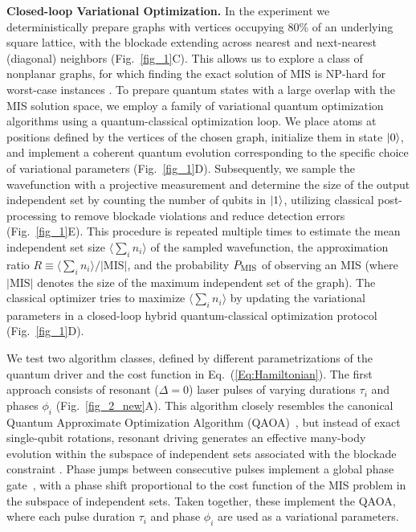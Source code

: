 \documentclass[twocolumn,amssymb,secnumarabic, prl, aps, nofootinbib]{revtex4-1}
\newcommand{\PMIS}{P_\textnormal{MIS}}
\begin{document}
\noindent \textbf
{Closed-loop Variational Optimization.}
In the experiment we deterministically prepare graphs with vertices occupying $80$\% of an underlying square lattice, with the blockade extending across nearest and next-nearest (diagonal) neighbors (Fig.~\ref{fig_1}C). This allows us to explore a class of nonplanar graphs, for which finding the exact solution of MIS is NP-hard for worst-case instances \cite{SI}. To prepare quantum states with a large overlap with the MIS solution space, we employ a family of variational quantum optimization algorithms using a quantum-classical optimization loop. We place atoms at positions defined by the vertices of the chosen graph, initialize them in state $\ket{0}$, and implement a coherent quantum evolution corresponding to the specific choice of variational parameters (Fig.~\ref{fig_1}D). Subsequently, we sample the wavefunction with a projective measurement and determine the size of the output independent set by counting the number of qubits in $\ket{1}$, utilizing classical post-processing to remove blockade violations and reduce detection errors \cite{SI} (Fig.~\ref{fig_1}E). This procedure is repeated multiple times to estimate the mean independent set size $\langle \sum_i n_i \rangle$ of the sampled wavefunction, the approximation ratio $R \equiv \langle \sum_i n_i \rangle/|\text{MIS}|$, and the probability $\PMIS$ of observing an MIS (where $|\text{MIS}|$ denotes the size of the maximum independent set of the graph). The classical optimizer tries to maximize $\langle \sum_i n_i \rangle$ by updating the variational parameters in a closed-loop hybrid quantum-classical optimization protocol \cite{SI} (Fig.~\ref{fig_1}D).


We test two algorithm classes, defined by different parametrizations of the quantum driver and the cost function in Eq.~(\ref{Eq:Hamiltonian}). The first approach consists of resonant ($\Delta = 0$) laser pulses of varying durations $\tau_i$ and phases $\phi_i$ (Fig.~\ref{fig_2_new}A). This algorithm closely resembles the canonical Quantum Approximate Optimization Algorithm (QAOA)~\cite{farhi_quantum_2014}, but instead of exact single-qubit rotations, resonant driving generates an effective many-body evolution within the subspace of independent sets associated with the blockade constraint \cite{SI}. Phase jumps between consecutive pulses implement a global phase gate~\cite{mckay_efficient_2017}, with a phase shift proportional to the cost function of the MIS problem in the subspace of independent sets. Taken together, these implement the QAOA, where each pulse duration $\tau_i$ and phase $\phi_i$ are used as a variational parameters. 
\end{document}
